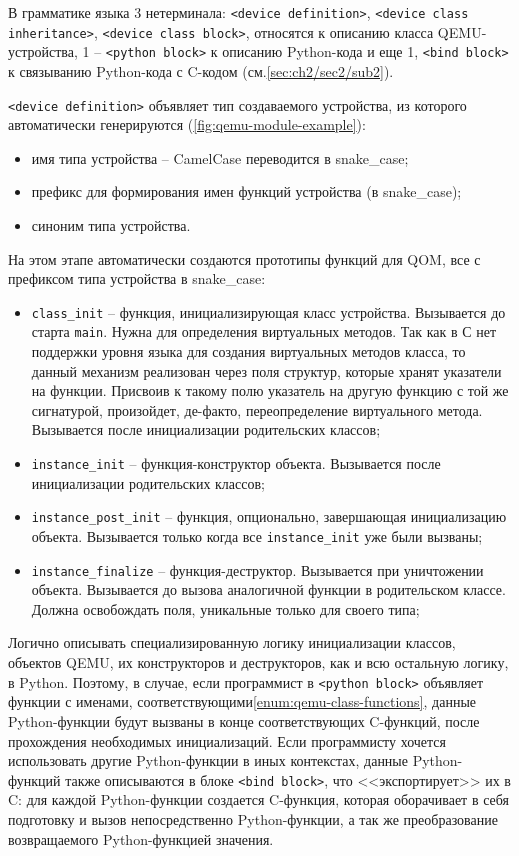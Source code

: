 В грамматике языка {\mylanguage} 3 нетерминала:
\texttt{<device definition>}, \texttt{<device class inheritance>}, \texttt{<device class block>},
относятся к описанию класса QEMU-устройства, 1 -- \texttt{<python block>} к описанию Python-кода
и еще 1, \texttt{<bind block>} к связыванию Python-кода с C-кодом (см.\cref{sec:ch2/sec2/sub2}).

\texttt{<device definition>} объявляет тип создаваемого устройства, из которого автоматически
генерируются (\cref{fig:qemu-module-example}):
\begin{itemize}
    \item имя типа устройства -- CamelCase переводится в snake\_case;
    \item префикс для формирования имен функций устройства (в snake\_case);
    \item синоним типа устройства.
\end{itemize}

На этом этапе автоматически создаются прототипы функций для QOM, все
с префиксом типа устройства в snake\_case:
\begin{itemize}
    \item \texttt{class\_init} -- функция, инициализирующая класс устройства.
        Вызывается до старта \texttt{main}. Нужна для определения виртуальных методов.
        Так как в С нет поддержки уровня языка для создания виртуальных методов
        класса, то данный механизм реализован через поля структур, которые хранят
        указатели на функции. Присвоив к такому полю указатель на другую функцию
        с той же сигнатурой, произойдет, де-факто, переопределение виртуального метода.
        Вызывается после инициализации родительских классов;
    \item \texttt{instance\_init} -- функция-конструктор объекта. Вызывается после
        инициализации родительских классов;
    \item \texttt{instance\_post\_init} -- функция, опционально, завершающая инициализацию
        объекта. Вызывается только когда все \texttt{instance\_init} уже были вызваны;
    \item \texttt{instance\_finalize} -- функция-деструктор. Вызывается при уничтожении
        объекта. Вызывается до вызова аналогичной функции в родительском классе.
        Должна освобождать поля, уникальные только для своего типа;
\end{itemize}\label{enum:qemu-class-functions}

Логично описывать специализированную логику инициализации классов,
объектов QEMU, их конструкторов и деструкторов, как и всю остальную логику, в Python.
Поэтому, в случае, если программист в \texttt{<python block>} объявляет функции с именами,
соответствующими\cref{enum:qemu-class-functions}, данные Python-функции будут вызваны
в конце соответствующих C-функций, после прохождения необходимых инициализаций.
Если программисту хочется использовать другие Python-функции в иных контекстах,
данные Python-функций также описываются в блоке \texttt{<bind block>},
что <<экспортирует>> их в C: для каждой Python-функции создается C-функция,
которая оборачивает в себя подготовку и вызов непосредственно Python-функции, а так же
преобразование возвращаемого Python-функцией значения.


